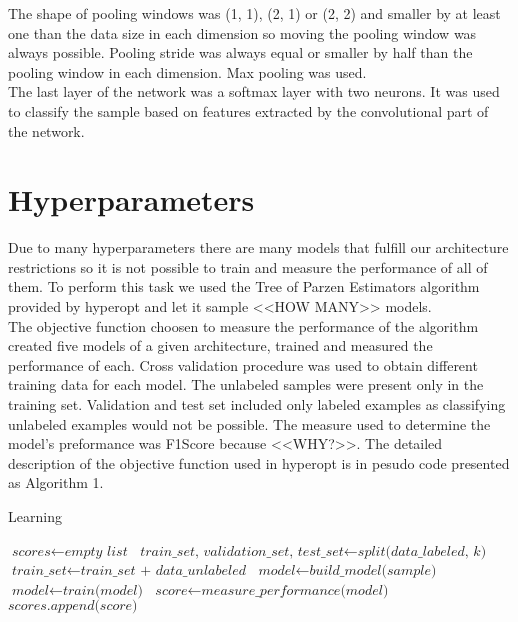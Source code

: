 \documentclass[a4paper,10pt]{report}
\begin{document}
      The shape of pooling windows was (1, 1), (2, 1) or (2, 2) and smaller by at least one than the data size in each dimension so moving the pooling window was always possible. Pooling stride was always equal or smaller by half than the pooling window in each dimension. Max pooling was used.\\
      
      The last layer of the network was a softmax layer with two neurons. It was used to classify the sample based on features extracted by the convolutional part of the network.\\
      
      \section{Hyperparameters} %
      Due to many hyperparameters there are many models that fulfill our architecture restrictions so it is not possible to train and measure the performance of all of them. To perform this task we used the Tree of Parzen Estimators algorithm provided by hyperopt and let it sample <<HOW MANY>> models.\\
      
      The objective function choosen to measure the performance of the algorithm created five models of a given architecture, trained and measured the performance of each. Cross validation procedure was used to obtain different training data for each model. The unlabeled samples were present only in the training set. Validation and test set included only labeled examples as classifying unlabeled examples would not be possible. The measure used to determine the model's preformance was F1Score because <<WHY?>>. The detailed description of the objective function used in hyperopt is in pesudo code presented as Algorithm 1.\\
      
      \begin{algorithm}
      \caption{Learning}\label{euclid}
      \begin{algorithmic}[1]
      \State
      \State $\textit{scores} \gets \textit{empty list}$
      \State
	\State $\textit{train\_set, validation\_set, test\_set} \gets \textit{split(data\_labeled, k)} $
	\State $\textit{train\_set} \gets \textit{train\_set + data\_unlabeled}$
	\State $\textit{model} \gets \textit{build\_model(sample)}$
	\State $\textit{model} \gets \textit{train(model)}$
	\State $\textit{score} \gets \textit{measure\_performance(model)}$
	\State $\textit{scores.append(score)}$
      \EndFor
      \State       
      \State
      \EndProcedure
      \end{algorithmic}
      \end{algorithm}
      
\end{document}
